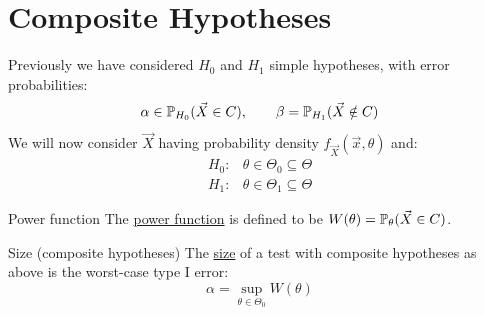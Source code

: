 \documentclass[../Main.tex]{subfiles}
\begin{document}
\section{Composite Hypotheses}
Previously we have considered $H_0$ and $H_1$ simple hypotheses, with error probabilities:
\begin{equation*}
    \alpha \in \P_{H_0}(\vec{X} \in C),\qquad \beta = \P_{H_1}(\vec{X} \notin C)
\end{equation*}
We will now consider $\vec{X}$ having probability density $f_{\vec{X}}(\vec{x}, \theta)$ and:
\begin{align*}
    H_0:& \theta \in \Theta_0 \subseteq \Theta \\
    H_1:& \theta \in \Theta_1 \subseteq \Theta 
\end{align*}
\begin{definition}{Power function}
    The \underline{power function} is defined to be $W(\theta) = \P_{\theta}(\vec{X} \in C)$.
\end{definition}
\begin{definition}{Size (composite hypotheses)}
    The \underline{size} of a test with composite hypotheses as above is the worst-case type I error:
    \begin{equation*}
        \alpha = \sup_{\theta \in \Theta_0} W(\theta)
    \end{equation*}
\end{definition}
\end{document}
